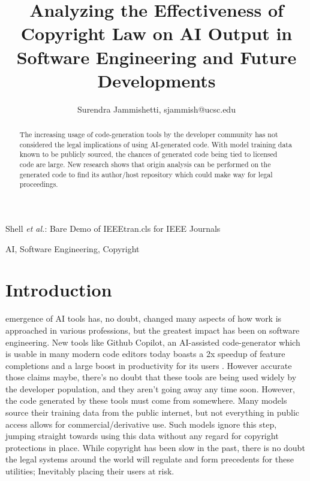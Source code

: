 \documentclass[journal]{IEEEtran}
\begin{document}
\title{Analyzing the Effectiveness of Copyright Law on AI Output in Software
Engineering and Future Developments}

\author{Surendra Jammishetti, sjammish@ucsc.edu}%
        
{Shell \MakeLowercase{\textit{et al.}}: Bare Demo of IEEEtran.cls for IEEE Journals}

\maketitle

\begin{abstract}
  The increasing usage of code-generation tools by the developer community
  has not considered the legal implications of using AI-generated code. With
  model training data known to be publicly sourced, the chances of
  generated code being tied to licensed code are large. New research shows that
  origin analysis can be performed on the generated code to find its author/host
  repository which could make way for legal proceedings.  

  
\end{abstract}

\begin{IEEEkeywords}
AI, Software Engineering, Copyright
\end{IEEEkeywords}

\section{Introduction}
%
% 

 emergence of AI tools has, no doubt, changed many
aspects of how work is approached in various professions,
but the greatest impact has been on software engineering.
New tools like Github Copilot, an AI-assisted code-generator
which is usable in many modern code editors today boasts
a 2x speedup of feature completions and a large boost in
productivity for its users \cite{github}. However accurate those claims
maybe, there's no doubt that these tools are being used widely
by the developer population, and they aren't going away any
time soon.
However, the code generated by these tools must come from
somewhere. Many models source their training data from the
public internet, but not everything in public access allows for
commercial/derivative use. Such models ignore this step,
jumping straight towards using this data without any regard
for copyright protections in place. While copyright has been
slow in the past, there is no doubt the legal systems around
the world will regulate and form precedents for these utilities;
Inevitably placing their users at risk.
\end{document}
